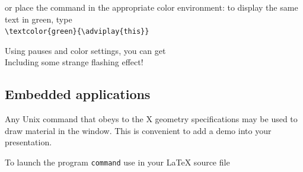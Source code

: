 \documentclass[12pt]{article}
\begin{document}
\noindent
or place the command in the appropriate color environment:
to display the same text in green, type\\
\verb+\textcolor{green}{\adviplay{this}}+\\
\adviwait
\textcolor{green}{\adviwait}

\noindent
Using pauses and color settings, you can get
\textcolor{red}{}\adviwait
{}
\textcolor{c2}{}\adviwait
{}
\textcolor{c3}{}\adviwait
{}
\textcolor{c4}{}\adviwait
{}
\textcolor{c5}{}\adviwait
{}
\textcolor{c6}{}\adviwait
{}\\
\textcolor{red}{}\adviwait
Including some strange flashing effect!
\textcolor{c6}{}\adviwait[\smallpause]%
\textcolor{c1}{}\adviwait[\smallpause]%
\textcolor{c2}{}\adviwait[\smallpause]%
\textcolor{c3}{}\adviwait[\smallpause]%
\textcolor{c4}{}\adviwait[\smallpause]%
\textcolor{c5}{}\adviwait[\smallpause]%
\textcolor{c6}{}\adviwait[\smallpause]%
\textcolor{c1}{}\adviwait[\smallpause]%
\textcolor{c2}{}\adviwait[\smallpause]%
\textcolor{c3}{}\adviwait[\smallpause]%
\textcolor{c4}{}\adviwait[\smallpause]%
\textcolor{c5}{}\adviwait[\smallpause]%
\textcolor{c6}{}\adviwait[\smallpause]%

\newpage

\subsection* {Embedded applications}

Any Unix command that obeys to the X geometry specifications may be
used to draw material in the {\ActiveDVI} window.
This is convenient to add a demo into your presentation.

\bigskip

\noindent
To launch the program {\verb"command"} use in your {\LaTeX} source file\\
\end{document}

